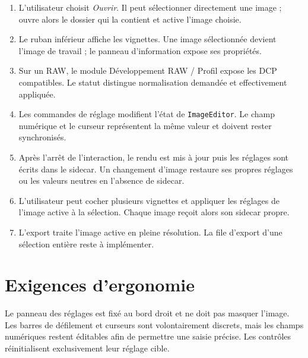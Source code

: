\begin{enumerate}
  \item L'utilisateur choisit \emph{Ouvrir}. Il peut sélectionner directement une image ; \IPR{} ouvre alors le dossier qui la contient et active l'image choisie.
  \item Le ruban inférieur affiche les vignettes. Une image sélectionnée devient l'image de travail ; le panneau d'information expose ses propriétés.
  \item Sur un RAW, le module Développement RAW / Profil expose les DCP compatibles.
  Le statut distingue normalisation demandée et effectivement appliquée.
  \item Les commandes de réglage modifient l'état de \texttt{ImageEditor}. Le champ numérique et le curseur représentent la même valeur et doivent rester synchronisés.
  \item Après l'arrêt de l'interaction, le rendu est mis à jour puis les réglages sont écrits dans le sidecar. Un changement d'image restaure ses propres réglages ou les valeurs neutres en l'absence de sidecar.
  \item L'utilisateur peut cocher plusieurs vignettes et appliquer les réglages de l'image active à la sélection. Chaque image reçoit alors son sidecar propre.
  \item L'export traite l'image active en pleine résolution. La file d'export
  d'une sélection entière reste à implémenter.
\end{enumerate}

\section{Exigences d'ergonomie}

Le panneau des réglages est fixé au bord droit et ne doit pas masquer l'image. Les barres de défilement et curseurs sont volontairement discrets, mais les champs numériques restent éditables afin de permettre une saisie précise. Les contrôles réinitialisent exclusivement leur réglage cible.
